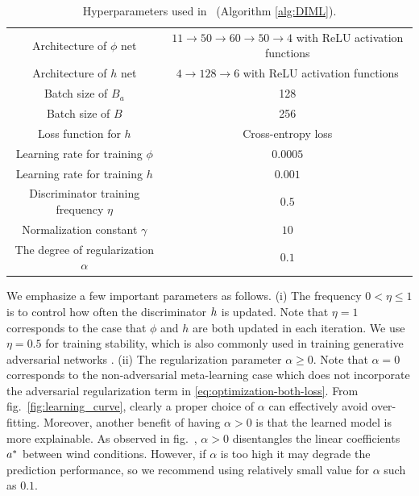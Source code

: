 \begin{table}
    \centering
    \begin{tabular}{c|c}
    Architecture of $\phi$ net & $11\rightarrow50\rightarrow60\rightarrow50\rightarrow4$ with ReLU activation functions \\
    Architecture of $h$ net & $4\rightarrow128\rightarrow6$ with ReLU activation functions \\
    Batch size of $B_a$ & 128 \\
    Batch size of $B$ & 256 \\
    Loss function for $h$ & Cross-entropy loss \\
    Learning rate for training $\phi$ & $0.0005$ \\
    Learning rate for training $h$ & $0.001$ \\
    Discriminator training frequency $\eta$ & $0.5$ \\
    Normalization constant $\gamma$ & $10$ \\
    The degree of regularization $\alpha$ & $0.1$ \\
    \end{tabular}
    \caption{Hyperparameters used in \DAML~(Algorithm \ref{alg:DIML}).}
    \label{tab:learning_hyperparameter}
\end{table}
 
We emphasize a few important parameters as follows. (i) The frequency $0<\eta\leq1$ is to control how often the discriminator $ h$ is updated. Note that $\eta=1$ corresponds to the case that $\phi$ and $h$ are both updated in each iteration. We use $\eta=0.5$ for training stability, which is also commonly used in training generative adversarial networks \cite{goodfellow2014generative}. (ii) The regularization parameter $\alpha\geq0$. Note that $\alpha=0$ corresponds to the non-adversarial meta-learning case which does not incorporate the adversarial regularization term in \cref{eq:optimization-both-loss}. From fig.~\ref{fig:learning_curve}, clearly a proper choice of $\alpha$ can effectively avoid over-fitting. Moreover, another benefit of having $\alpha>0$ is that the learned model is more explainable. As observed in fig.~, $\alpha>0$ disentangles the linear coefficients $ a^*$ between wind conditions. However, if $\alpha$ is too high it may degrade the prediction performance, so we recommend using relatively small value for $\alpha$ such as $0.1$.

